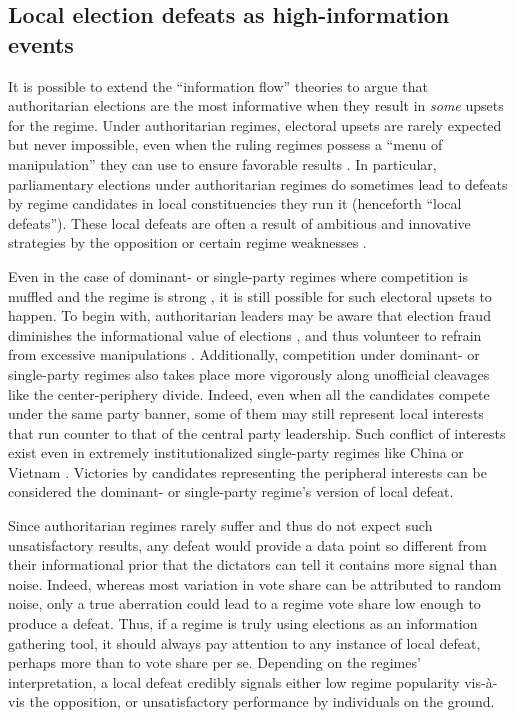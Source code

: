 \documentclass[12pt]{article}\usepackage[]{graphicx}\usepackage[]{color}
\newcommand{\1}{\mathbbm{1}}
\begin{document}
\subsection{Local election defeats as high-information events}
It is possible to extend the ``information flow'' theories to argue that authoritarian elections are the most informative when they result in \textit{some} upsets for the regime. Under authoritarian regimes, electoral upsets are rarely expected but never impossible, even when the ruling regimes possess a ``menu of manipulation'' they can use to ensure favorable results \citep{Schedler2002Menu}. In particular, parliamentary elections under authoritarian regimes do sometimes lead to defeats by regime candidates in local constituencies they run it (henceforth ``local defeats''). These local defeats are often a result of ambitious and innovative strategies by the opposition \citep{BunceWolchik2010} or certain regime weaknesses \citep{LevistkyWay2010}. 

Even in the case of dominant- or single-party regimes where competition is muffled \citep{Schedler2002} and the regime is strong \citep{BunceWolchik2010}, it is still possible for such electoral upsets to happen. To begin with, authoritarian leaders may be aware that election fraud diminishes the informational value of elections \citep{Wintrobe2000}, and thus volunteer to refrain from excessive manipulations \citep{MaleskySchuler2011}. Additionally, competition under dominant- or single-party regimes also takes place more vigorously along unofficial cleavages like the center-periphery divide. Indeed, even when all the candidates compete under the same party banner, some of them may still represent local interests that run counter to that of the central party leadership. Such conflict of interests exist even in extremely institutionalized single-party regimes like China \citep{Manion2014} or Vietnam \citep{MaleskySchuler2011}. Victories by candidates representing the peripheral interests can be considered the dominant- or single-party regime's version of local defeat.
	
Since authoritarian regimes rarely suffer and thus do not expect such unsatisfactory results, any defeat would provide a data point so different from their informational prior that the dictators can tell it contains more signal than noise. Indeed, whereas most variation in vote share can be attributed to random noise, only a true aberration could lead to a regime vote share low enough to produce a defeat. Thus, if a regime is truly using elections as an information gathering tool, it should always pay attention to any instance of local defeat, perhaps more than to vote share per se. Depending on the regimes' interpretation, a local defeat credibly signals either low regime popularity vis-\`{a}-vis the opposition, or unsatisfactory performance by individuals on the ground.
\end{document}
